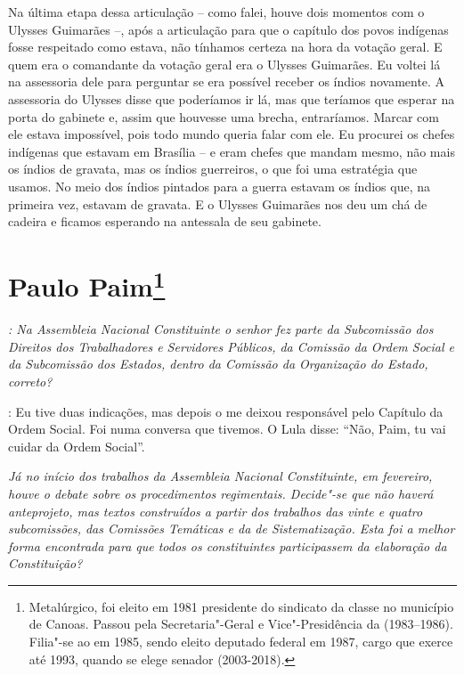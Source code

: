 Na última etapa dessa articulação -- como falei, houve
dois momentos com o Ulysses Guimarães --, após a articulação para que o
capítulo dos povos indígenas fosse respeitado como estava, não tínhamos
certeza na hora da votação geral. E quem era o comandante da votação
geral era o Ulysses Guimarães. Eu voltei lá na assessoria dele para
perguntar se era possível receber os índios novamente. A assessoria do
Ulysses disse que poderíamos ir lá, mas que teríamos que esperar na
porta do gabinete e, assim que houvesse uma brecha, entraríamos. Marcar
com ele estava impossível, pois todo mundo queria falar com ele. Eu
procurei os chefes indígenas que estavam em Brasília -- e eram chefes
que mandam mesmo, não mais os índios de gravata, mas os índios
guerreiros, o que foi uma estratégia que usamos. No meio dos índios
pintados para a guerra estavam os índios que, na primeira vez, estavam
de gravata. E o Ulysses Guimarães nos deu um chá de cadeira e ficamos
esperando na antessala de seu gabinete.

\chapter{Paulo Paim\footnote{Metalúrgico, foi eleito em 1981 presidente do sindicato da classe no
município de Canoas. Passou pela Secretaria"-Geral e Vice"-Presidência da
 (1983--1986). Filia"-se ao  em 1985, sendo eleito deputado federal em 1987, cargo que exerce até 1993, quando se elege senador (2003-2018).}}

\emph{: Na Assembleia Nacional Constituinte o senhor fez parte da
Subcomissão dos Direitos dos Trabalhadores e Servidores Públicos, da
Comissão da Ordem Social e da Subcomissão dos Estados, dentro da
Comissão da Organização do Estado, correto?}

: Eu tive duas indicações, mas depois o  me deixou
responsável pelo Capítulo da Ordem Social. Foi numa conversa que
tivemos. O Lula disse: ``Não, Paim, tu vai cuidar da Ordem Social''.

\medskip

\noindent\emph{Já no início dos trabalhos da Assembleia Nacional Constituinte,
em fevereiro, houve o debate sobre os procedimentos regimentais.
Decide"-se que não haverá anteprojeto, mas textos construídos a partir
dos trabalhos das vinte e quatro subcomissões, das Comissões Temáticas e
da de Sistematização. Esta foi a melhor forma encontrada para que todos
os constituintes participassem da elaboração da Constituição?}

